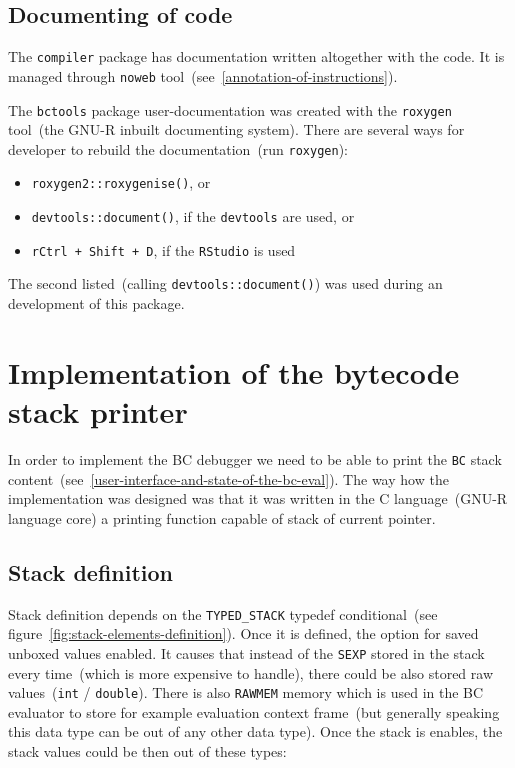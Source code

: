 \documentclass[thesis=M,english]{FITthesis}[2018/10/20]
\newcommand{\code}[1]{\texttt{#1}}
\begin{document}

\subsection{Documenting of code}

The \code{compiler} package has documentation written altogether with the code. It is managed through \code{noweb} tool~(see~\ref{annotation-of-instructions}).

The \code{bctools} package user-documentation was created with the \code{roxygen} tool~(the GNU-R inbuilt documenting system). There are several ways for developer to rebuild the documentation~(run \code{roxygen}):
\begin{itemize}
 \item \code{roxygen2::roxygenise()}, or
 \item \code{devtools::document()}, if the \code{devtools} are used, or
 \item \code{rCtrl + Shift + D}, if the \code{RStudio} is used
\end{itemize}

The second listed~(calling \code{devtools::document()}) was used during an development of this package.

\section{Implementation of the bytecode stack printer}\label{implementation-of-stack-printer}

In order to implement the BC debugger we need to be able to print the \code{BC} stack content~(see~\ref{user-interface-and-state-of-the-bc-eval}). The way how the implementation was designed was that it was written in the C language~(GNU-R language core) a printing function capable of stack of current pointer.

\subsection{Stack definition}\label{stack-definition}

Stack definition depends on the \code{TYPED{\_}STACK} typedef conditional~(see figure~\ref{fig:stack-elements-definition}). Once it is defined, the option for saved unboxed values enabled. It causes that instead of the \code{SEXP} stored in the stack every time~(which is more expensive to handle), there could be also stored raw values~(\code{int} / \code{double}). There is also \code{RAWMEM} memory which is used in the BC evaluator to store for example evaluation context frame~(but generally speaking this data type can be out of any other data type). Once the stack is enables, the stack values could be then out of these types:
\end{document}
